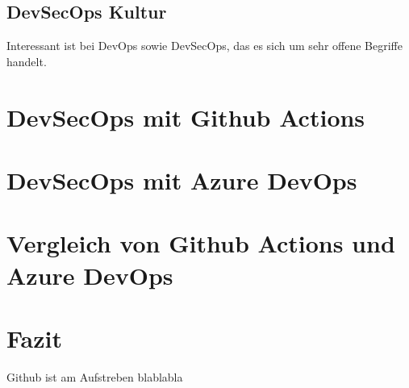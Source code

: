 \section{DevSecOps Kultur}
Interessant ist bei DevOps sowie DevSecOps, das es sich um sehr offene Begriffe handelt. 

\chapter{DevSecOps mit Github Actions}

\chapter{DevSecOps mit Azure DevOps}

\chapter{Vergleich von Github Actions und Azure DevOps}

\chapter{Fazit}
Github ist am Aufstreben blablabla